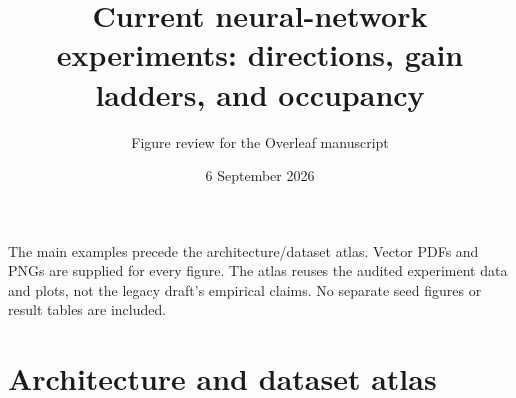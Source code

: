 \documentclass[11pt]{article}
\title{Current neural-network experiments: directions, gain ladders, and occupancy}
\author{Figure review for the Overleaf manuscript}
\date{6 September 2026}
\begin{document}
\maketitle
\noindent The main examples precede the architecture/dataset atlas. Vector PDFs and PNGs are supplied for every figure. The atlas reuses the audited experiment data and plots, not the legacy draft's empirical claims. No separate seed figures or result tables are included.

\section*{Architecture and dataset atlas}

\end{document}
